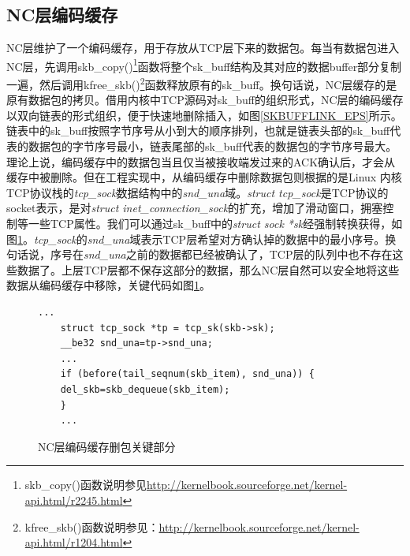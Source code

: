 \subsection{NC层编码缓存}
NC层维护了一个编码缓存，用于存放从TCP层下来的数据包。每当有数据包进入NC层，先调用skb\_copy()\footnote{skb\_copy()函数说明参见\url{http://kernelbook.sourceforge.net/kernel-api.html/r2245.html}}函数将整个sk\_buff结构及其对应的数据buffer部分复制一遍，然后调用kfree\_skb()\footnote{kfree\_skb()函数说明参见：\url{http://kernelbook.sourceforge.net/kernel-api.html/r1204.html}}函数释放原有的sk\_buff。换句话说，NC层缓存的是原有数据包的拷贝。借用内核中TCP源码对sk\_buff的组织形式，NC层的编码缓存以双向链表的形式组织，便于快速地删除插入，如图\ref{SKBUFFLINK_EPS}所示。链表中的sk\_buff按照字节序号从小到大的顺序排列，也就是链表头部的sk\_buff代表的数据包的字节序号最小，链表尾部的sk\_buff代表的数据包的字节序号最大。理论上说，编码缓存中的数据包当且仅当被接收端发过来的ACK确认后，才会从缓存中被删除。但在工程实现中，从编码缓存中删除数据包则根据的是Linux 内核TCP协议栈的\emph{tcp\_sock}数据结构中的\emph{snd\_una}域。\emph{struct tcp\_sock}是TCP协议的socket表示，是对\emph{struct inet\_connection\_sock}的扩充，增加了滑动窗口，拥塞控制等一些TCP属性。我们可以通过sk\_buff中的\emph{struct sock *sk}经强制转换获得，如图\ref{NCDEL}。\emph{tcp\_sock}的\emph{snd\_una}域表示TCP层希望对方确认掉的数据中的最小序号。换句话说，序号在\emph{snd\_una}之前的数据都已经被确认了，TCP层的队列中也不存在这些数据了。上层TCP层都不保存这部分的数据，那么NC层自然可以安全地将这些数据从编码缓存中移除，关键代码如图\ref{NCDEL}。

\begin{figure}
	\begin{lstlisting}[language={[ANSI]C}]
	...
	struct tcp_sock *tp = tcp_sk(skb->sk);
	__be32 snd_una=tp->snd_una;
	...
	if (before(tail_seqnum(skb_item), snd_una)) {
	del_skb=skb_dequeue(skb_item);
	}
	...
	\end{lstlisting}
	\caption{NC层编码缓存删包关键部分}
	\label{NCDEL}
\end{figure}

